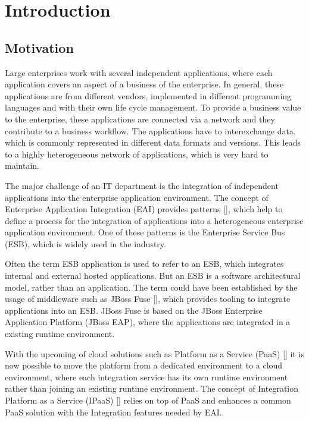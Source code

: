 \chapter{Introduction}
\label{cha:intro}

\section{Motivation}
\label{sec:intro-motivation}
Large enterprises work with several independent applications, where each application covers an aspect of a business of the enterprise. In general, these applications are from different vendors, implemented in different programming languages and with their own life cycle management. To provide a business value to the enterprise, these applications are connected via a network and they contribute to a business workflow. The applications have to interexchange data, which is commonly represented in different data formats and versions. This leads to a highly heterogeneous network of applications, which is very hard to maintain.

The major challenge of an IT department is the integration of independent applications into the enterprise application environment. The concept of Enterprise Application Integration (EAI) provides patterns [\cite{EIP}], which help to define a process for the integration of applications into a heterogeneous enterprise application environment. One of these patterns is the Enterprise Service Bus (ESB), which is widely used in the industry.

Often the term ESB application is used to refer to an ESB, which integrates internal and external hosted applications. But an ESB is a software architectural model, rather than an application. The term could have been established by the usage of middleware such as JBoss Fuse [\cite{Fuse2018}], which provides tooling to integrate applications into an ESB. JBoss Fuse is based on the JBoss Enterprise Application Platform (JBoss EAP), where the applications are integrated in a existing runtime environment. 

With the upcoming of cloud solutions such as Platform as a Service (PaaS) [\cite[p. 2-3]{PaaS2015}] it is now possible to move the platform from a dedicated environment to a cloud environment, where each integration service has its own runtime environment rather than joining an existing runtime environment. The concept of Integration Platform as a Service (IPaaS) [\cite[p. 3]{iPaaSP12015}] relies on top of PaaS and enhances a common PaaS solution with the Integration features needed by EAI.
   

